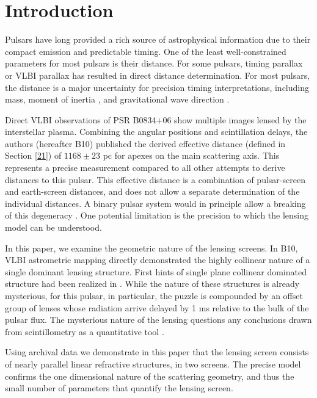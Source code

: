 \documentclass[useAMS,usenatbib]{mn2e}
\begin{document}
\section{Introduction}

Pulsars have long provided a rich source of astrophysical information
due to their compact emission and predictable timing. One of the
least well-constrained parameters for most pulsars is their 
distance.  For some pulsars, timing parallax or VLBI parallax has
resulted in direct distance determination.  
For most pulsars, the
distance is a major uncertainty for precision timing interpretations,
including mass, moment of inertia \citep{2006Sci...314...97K,2012hpa..book.....L}, and
gravitational wave direction \citep{boyle2012}.

Direct VLBI observations of PSR B0834+06 show multiple images lensed
by the interstellar plasma.  
Combining the angular positions and
scintillation delays, the authors \citep{2010ApJ...708..232B} (hereafter B10) published the derived effective
distance (defined in Section \ref{21}) of $1168\pm 23$ pc
for apexes on the main scattering axis.
This represents a precise
measurement compared to all other attempts to derive distances to this
pulsar.  This effective distance is a combination of pulsar-screen and
earth-screen distances, and does not allow a separate determination of
the individual distances.  A binary pulsar system would in principle
allow a breaking of this degeneracy \citep{2014MNRAS.442.3338P}. One
potential limitation is the precision to which the lensing model can
be understood.  

In this paper, we examine the geometric nature of the lensing screens.
In B10, VLBI astrometric mapping directly demonstrated the highly
collinear nature of a single dominant lensing structure.  First hints
of single plane collinear dominated structure had been realized in
\citet{2001ApJ...549L..97S}.   While the nature of these structures
is already mysterious, for this pulsar, in particular, the puzzle is compounded by an offset group
of lenses whose radiation arrive delayed by 1 ms relative to the bulk of the pulsar flux.  The mysterious nature of the
lensing questions any conclusions drawn from scintillometry as a
quantitative tool \citep{2014MNRAS.440L..36P}.


Using archival data we demonstrate in this paper that the lensing screen
consists of nearly parallel linear refractive structures, in two
screens.  The precise model confirms the one dimensional nature of the scattering geometry, and
thus the small number of parameters that
quantify the lensing screen. 
\end{document}

